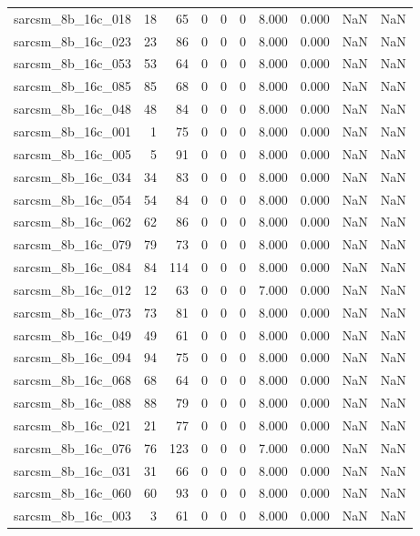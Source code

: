\documentclass{article}
\begin{document}
\begin{longtable}{lrrrrrrrrr}
sarcsm\_8b\_16c\_018 & 18 & 65 & 0 & 0 & 0 & 8.000 & 0.000 & NaN & NaN \\
sarcsm\_8b\_16c\_023 & 23 & 86 & 0 & 0 & 0 & 8.000 & 0.000 & NaN & NaN \\
sarcsm\_8b\_16c\_053 & 53 & 64 & 0 & 0 & 0 & 8.000 & 0.000 & NaN & NaN \\
sarcsm\_8b\_16c\_085 & 85 & 68 & 0 & 0 & 0 & 8.000 & 0.000 & NaN & NaN \\
sarcsm\_8b\_16c\_048 & 48 & 84 & 0 & 0 & 0 & 8.000 & 0.000 & NaN & NaN \\
sarcsm\_8b\_16c\_001 & 1 & 75 & 0 & 0 & 0 & 8.000 & 0.000 & NaN & NaN \\
sarcsm\_8b\_16c\_005 & 5 & 91 & 0 & 0 & 0 & 8.000 & 0.000 & NaN & NaN \\
sarcsm\_8b\_16c\_034 & 34 & 83 & 0 & 0 & 0 & 8.000 & 0.000 & NaN & NaN \\
sarcsm\_8b\_16c\_054 & 54 & 84 & 0 & 0 & 0 & 8.000 & 0.000 & NaN & NaN \\
sarcsm\_8b\_16c\_062 & 62 & 86 & 0 & 0 & 0 & 8.000 & 0.000 & NaN & NaN \\
sarcsm\_8b\_16c\_079 & 79 & 73 & 0 & 0 & 0 & 8.000 & 0.000 & NaN & NaN \\
sarcsm\_8b\_16c\_084 & 84 & 114 & 0 & 0 & 0 & 8.000 & 0.000 & NaN & NaN \\
sarcsm\_8b\_16c\_012 & 12 & 63 & 0 & 0 & 0 & 7.000 & 0.000 & NaN & NaN \\
sarcsm\_8b\_16c\_073 & 73 & 81 & 0 & 0 & 0 & 8.000 & 0.000 & NaN & NaN \\
sarcsm\_8b\_16c\_049 & 49 & 61 & 0 & 0 & 0 & 8.000 & 0.000 & NaN & NaN \\
sarcsm\_8b\_16c\_094 & 94 & 75 & 0 & 0 & 0 & 8.000 & 0.000 & NaN & NaN \\
sarcsm\_8b\_16c\_068 & 68 & 64 & 0 & 0 & 0 & 8.000 & 0.000 & NaN & NaN \\
sarcsm\_8b\_16c\_088 & 88 & 79 & 0 & 0 & 0 & 8.000 & 0.000 & NaN & NaN \\
sarcsm\_8b\_16c\_021 & 21 & 77 & 0 & 0 & 0 & 8.000 & 0.000 & NaN & NaN \\
sarcsm\_8b\_16c\_076 & 76 & 123 & 0 & 0 & 0 & 7.000 & 0.000 & NaN & NaN \\
sarcsm\_8b\_16c\_031 & 31 & 66 & 0 & 0 & 0 & 8.000 & 0.000 & NaN & NaN \\
sarcsm\_8b\_16c\_060 & 60 & 93 & 0 & 0 & 0 & 8.000 & 0.000 & NaN & NaN \\
sarcsm\_8b\_16c\_003 & 3 & 61 & 0 & 0 & 0 & 8.000 & 0.000 & NaN & NaN \\

\end{longtable}
\end{document}
